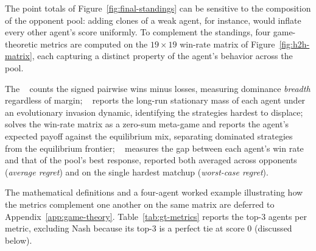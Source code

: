The point totals of Figure~\ref{fig:final-standings} can be sensitive to the composition of the opponent pool: adding clones of a weak agent, for instance, would inflate every other agent's score uniformly. To complement the standings, four game-theoretic metrics are computed on the $19{\times}19$ win-rate matrix of Figure~\ref{fig:h2h-matrix}, each capturing a distinct property of the agent's behavior across the pool.

\vspace*{0.15cm}

\noindent The ~\cite{saariCopelandMethodRelationships1996} counts the signed pairwise wins minus losses, measuring dominance \emph{breadth} regardless of margin; ~\cite{omidshafieiARankMultiAgentEvaluation2019} reports the long-run stationary mass of each agent under an evolutionary invasion dynamic, identifying the strategies hardest to displace; ~\cite{balduzziReevaluatingEvaluation2018} solves the win-rate matrix as a zero-sum meta-game and reports the agent's expected payoff against the equilibrium mix, separating dominated strategies from the equilibrium frontier; ~\cite{savageTheoryStatisticalDecision1951, balduzziReevaluatingEvaluation2018} measures the gap between each agent's win rate and that of the pool's best response, reported both averaged across opponents (\textit{average regret}) and on the single hardest matchup (\textit{worst-case regret}).

\vspace*{0.15cm}

The mathematical definitions and a four-agent worked example illustrating how the metrics complement one another on the same matrix are deferred to Appendix~\ref{app:game-theory}. Table~\ref{tab:gt-metrics} reports the top-$3$ agents per metric, excluding Nash because its top-$3$ is a perfect tie at score $0$ (discussed below).

\vspace*{-0.15cm}

